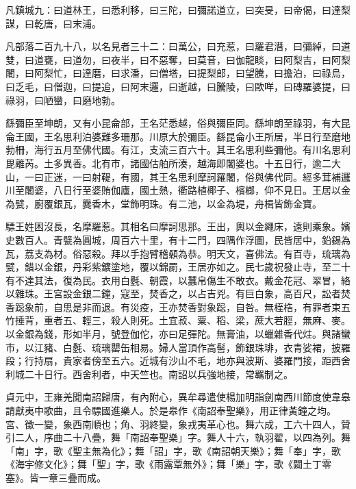 \begin{pinyinscope}
 凡鎮城九：曰道林王，曰悉利移，曰三陀，曰彌諾道立，曰突旻，曰帝偈，曰達梨謀，曰乾唐，曰末浦。



 凡部落二百九十八，以名見者三十二：曰萬公，曰充惹，曰羅君潛，曰彌綽，曰道雙，曰道甕，曰道勿，曰夜半，曰不惡奪，曰莫音，曰伽龍睒，曰阿梨吉，曰阿梨闍，曰阿梨忙，曰達磨，曰求潘，曰僧塔，曰提梨郎，曰望騰，曰擔泊，曰祿烏，曰乏毛，曰僧迦，曰提追，曰阿末邏，曰逝越，曰騰陵，曰歐咩，曰磚羅婆提，曰祿羽，曰陋蠻，曰磨地勃。



 繇彌臣至坤朗，又有小昆侖部，王名茫悉越，俗與彌臣同。繇坤朗至祿羽，有大昆侖王國，王名思利泊婆難多珊那。川原大於彌臣。繇昆侖小王所居，半日行至磨地勃柵，海行五月至佛代國。有江，支流三百六十。其王名思利些彌他。有川名思利毘離芮。土多異香。北有市，諸國估舶所湊，越海即闍婆也。十五日行，逾二大山，一曰正迷，一曰射鞮，有國，其王名思利摩訶羅闍，俗與佛代同。經多茸補邏川至闍婆，八日行至婆賄伽廬，國土熱，衢路植椰子、檳榔，仰不見日。王居以金為甓，廚覆銀瓦，爨香木，堂飾明珠。有二池，以金為堤，舟楫皆飾金寶。



 驃王姓困沒長，名摩羅惹。其相名曰摩訶思那。王出，輿以金繩床，遠則乘象。嬪史數百人。青甓為圓城，周百六十里，有十二門，四隅作浮圖，民皆居中，鉛錫為瓦，荔支為材。俗惡殺。拜以手抱臂稽顙為恭。明天文，喜佛法。有百寺，琉璃為甓，錯以金銀，丹彩紫鑛塗地，覆以錦罽，王居亦如之。民七歲祝發止寺，至二十有不達其法，復為民。衣用白氎、朝霞，以蠶帛傷生不敢衣。戴金花冠、翠冒，絡以雜珠。王宮設金銀二鐘，寇至，焚香之，以占吉兇。有巨白象，高百尺，訟者焚香跽象前，自思是非而退。有災疫，王亦焚香對象跽，自咎。無桎梏，有罪者束五竹捶背，重者五、輕三，殺人則死。土宜菽、粟、稻、梁，蔗大若脛，無麻、麥。以金銀為錢，形如半月，號登伽佗，亦曰足彈陀。無膏油，以蠟雜香代炷。與諸蠻市，以江豬、白氎、琉璃罌缶相易。婦人當頂作高髻，飾銀珠琲，衣青娑裙，披羅段；行持扇，貴家者傍至五六。近城有沙山不毛，地亦與波斯、婆羅門接，距西舍利城二十日行。西舍利者，中天竺也。南詔以兵強地接，常羈制之。



 貞元中，王雍羌聞南詔歸唐，有內附心，異牟尋遣使楊加明詣劍南西川節度使韋皋請獻夷中歌曲，且令驃國進樂人。於是皋作《南詔奉聖樂》，用正律黃鐘之均。宮、徵一變，象西南順也；角、羽終變，象戎夷革心也。舞六成，工六十四人，贊引二人，序曲二十八疊，舞「南詔奉聖樂」字。舞人十六，執羽翟，以四為列。舞「南」字，歌《聖主無為化》；舞「詔」字，歌《南詔朝天樂》；舞「奉」字，歌《海宇修文化》；舞「聖」字，歌《雨露覃無外》；舞「樂」字，歌《闢土丁零塞》。皆一章三疊而成。




\end{pinyinscope}
